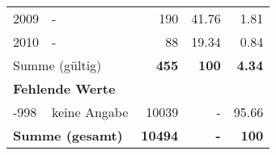 \begin{longtable}{lXrrr}
     2009 &
     \multicolumn{1}{X}{ -  } &


       \num{190} &
       \num[round-mode=places,round-precision=2]{41.76} &
         \num[round-mode=places,round-precision=2]{1.81} \\

     2010 &
     \multicolumn{1}{X}{ -  } &


       \num{88} &
       \num[round-mode=places,round-precision=2]{19.34} &
         \num[round-mode=places,round-precision=2]{0.84} \\
     \midrule
     \multicolumn{2}{l}{Summe (gültig)} &
       \textbf{\num{455}} &
     \textbf{\num{100}} &
       \textbf{\num[round-mode=places,round-precision=2]{4.34}} \\
     \multicolumn{5}{l}{\textbf{Fehlende Werte}}\\
       -998 &
       keine Angabe &
         \num{10039} &
        - &
         \num[round-mode=places,round-precision=2]{95.66} \\
     \midrule
     \multicolumn{2}{l}{\textbf{Summe (gesamt)}} &
          \textbf{\num{10494}} &
        \textbf{-} &
        \textbf{\num{100}} \\
     \bottomrule
     \end{longtable}
     
